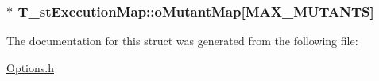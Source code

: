\hypertarget{structT__stExecutionMap_a7f19bba04bd09de7b2af211dedce7dfd}{
\subsubsection[{o\-Mutant\-Map}]{$\ast$ T\-\_\-st\-Execution\-Map\-::o\-Mutant\-Map\mbox{[}{\bf M\-A\-X\-\_\-\-M\-U\-T\-A\-N\-T\-S}\mbox{]}}}\label{structT__stExecutionMap_a7f19bba04bd09de7b2af211dedce7dfd}


The documentation for this struct was generated from the following file\-:\begin{DoxyCompactItemize}
\item 
\hyperlink{Options_8h}{Options.\-h}\end{DoxyCompactItemize}
